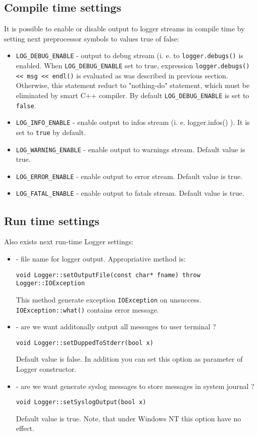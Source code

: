 \documentclass[10pt]{article}
\begin{document}
\subsection{Compile time settings}

  
   It is possible to enable or disable output to logger streams in
  compile time by setting next preprocessor symbols to values true of false:
  \begin{itemize}
    \item \verb|LOG_DEBUG_ENABLE| - output to debug stream (i. e. to
   \verb|logger.debugs()| is enabled. When \verb|LOG_DEBUG_ENABLE| set to
   true, expression \verb|logger.debugs() << msg << endl()| is evaluated as
   was described in previous section. Otherwise, this statement reduct to
   "nothing-do" statement, which must be eliminated by smart C++ compiler.
   By default \verb|LOG_DEBUG_ENABLE| is set to \verb|false|.
    \item \verb|LOG_INFO_ENABLE| - enable output to infos stream (i. e. logger.infos() ). It is set to \verb|true| by default.
    \item \verb|LOG_WARNING_ENABLE| - enable output to warnings stream. 
 Default value is true.
    \item \verb|LOG_ERROR_ENABLE| - enable output to error stream. 
 Default value is true.
    \item \verb|LOG_FATAL_ENABLE| - enable output to fatals stream. 
 Default value is true.
 \end{itemize}

\subsection{Run time settings}

 Also exists next  run-time Logger settings:
\begin{itemize}
  \item - file name for logger output.  Appropriative method is:
\begin{verbatim}
void Logger::setOutputFile(const char* fname) throw Logger::IOException
\end{verbatim}
  This method generate exception \verb|IOException| on unsuccess.
  \verb|IOException::what()| contains error message.
  \item - are we want additonally output all messuges to user terminal ?
\begin{verbatim}
void Logger::setDuppedToStderr(bool x) 
\end{verbatim}
  Default value is false. In addition you can set this option as parameter of
Logger constructor.
  \item - are we want generate syslog messages to store messages in system journal ?
\begin{verbatim}
void Logger::setSyslogOutput(bool x) 
\end{verbatim}
   Default value is true. Note, that under Windows NT this option have no effect.
\end{itemize}
\end{document}
